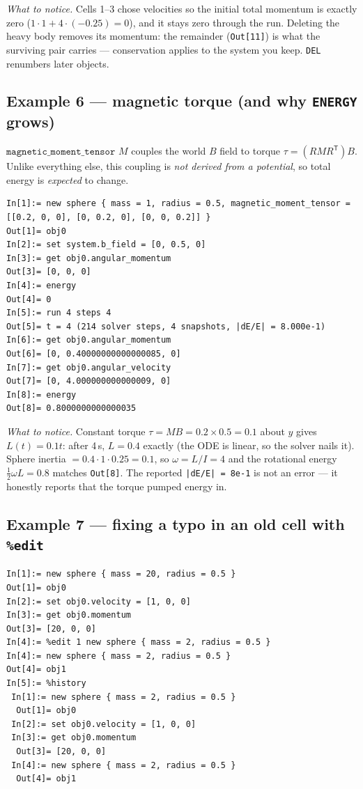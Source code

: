 \documentclass[11pt]{article}
\newcommand{\kw}[1]{\texttt{\uppercase{#1}}}
\newcommand{\code}[1]{\texttt{#1}}
\begin{document}
\emph{What to notice.} Cells 1--3 chose velocities so the initial total
momentum is exactly zero ($1\cdot1 + 4\cdot(-0.25) = 0$), and it stays
zero through the run. Deleting the heavy body removes its momentum: the
remainder (\code{Out[11]}) is what the surviving pair carries ---
conservation applies to the system you keep. \kw{del} renumbers later
objects.

\subsection{Example 6 --- magnetic torque (and why \kw{energy} grows)}

$\code{magnetic\_moment\_tensor}$ $M$ couples the world $B$ field to
torque $\tau = (RMR^{\mathsf T})B$. Unlike everything else, this
coupling is \emph{not derived from a potential}, so total energy is
\emph{expected} to change.

\begin{lstlisting}
In[1]:= new sphere { mass = 1, radius = 0.5, magnetic_moment_tensor = [[0.2, 0, 0], [0, 0.2, 0], [0, 0, 0.2]] }
Out[1]= obj0
In[2]:= set system.b_field = [0, 0.5, 0]
In[3]:= get obj0.angular_momentum
Out[3]= [0, 0, 0]
In[4]:= energy
Out[4]= 0
In[5]:= run 4 steps 4
Out[5]= t = 4 (214 solver steps, 4 snapshots, |dE/E| = 8.000e-1)
In[6]:= get obj0.angular_momentum
Out[6]= [0, 0.40000000000000085, 0]
In[7]:= get obj0.angular_velocity
Out[7]= [0, 4.000000000000009, 0]
In[8]:= energy
Out[8]= 0.8000000000000035
\end{lstlisting}

\emph{What to notice.} Constant torque $\tau = MB = 0.2\times0.5 = 0.1$
about $y$ gives $L(t) = 0.1t$: after 4\,s, $L = 0.4$ exactly (the ODE is
linear, so the solver nails it). Sphere inertia
$= 0.4\cdot1\cdot0.25 = 0.1$, so $\omega = L/I = 4$ and the rotational
energy $\tfrac12\omega L = 0.8$ matches \code{Out[8]}. The reported
\code{|dE/E| = 8e-1} is not an error --- it honestly reports that the
torque pumped energy in.

\subsection{Example 7 --- fixing a typo in an old cell with \code{\%edit}}

\begin{lstlisting}
In[1]:= new sphere { mass = 20, radius = 0.5 }
Out[1]= obj0
In[2]:= set obj0.velocity = [1, 0, 0]
In[3]:= get obj0.momentum
Out[3]= [20, 0, 0]
In[4]:= %edit 1 new sphere { mass = 2, radius = 0.5 }
In[4]:= new sphere { mass = 2, radius = 0.5 }
Out[4]= obj1
In[5]:= %history
 In[1]:= new sphere { mass = 2, radius = 0.5 }
  Out[1]= obj0
 In[2]:= set obj0.velocity = [1, 0, 0]
 In[3]:= get obj0.momentum
  Out[3]= [20, 0, 0]
 In[4]:= new sphere { mass = 2, radius = 0.5 }
  Out[4]= obj1
\end{lstlisting}
\end{document}
